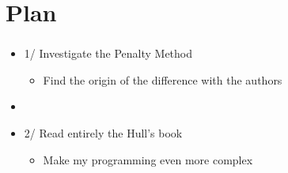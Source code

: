 \section{Plan}


\begin{frame}[c]
\frametitle{\insertsection}
\begin{itemize}
	\item 1/ Investigate the Penalty Method
	\begin{itemize}
		\item Find the origin of the difference with the authors
	\end{itemize}
	\item []
	\item 2/ Read entirely the Hull's book
	\begin{itemize}
		\item Make my programming even more complex
	\end{itemize}
\end{itemize}
\end{frame}
